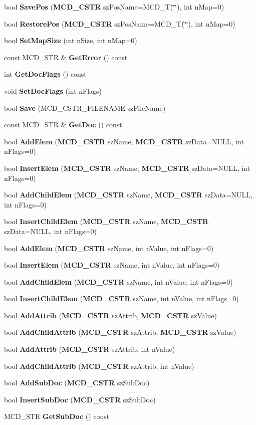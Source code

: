\begin{CompactItemize}
bool {\bf SavePos} ({\bf MCD\_\-CSTR} szPosName=MCD\_\-T(\char`\"{}\char`\"{}), int nMap=0)
\item 
bool {\bf RestorePos} ({\bf MCD\_\-CSTR} szPosName=MCD\_\-T(\char`\"{}\char`\"{}), int nMap=0)
\item 
bool {\bf SetMapSize} (int nSize, int nMap=0)
\item 
const MCD\_\-STR \& {\bf GetError} () const 
\item 
int {\bf GetDocFlags} () const 
\item 
void {\bf SetDocFlags} (int nFlags)
\item 
bool {\bf Save} (MCD\_\-CSTR\_\-FILENAME szFileName)
\item 
const MCD\_\-STR \& {\bf GetDoc} () const 
\item 
bool {\bf AddElem} ({\bf MCD\_\-CSTR} szName, {\bf MCD\_\-CSTR} szData=NULL, int nFlags=0)
\item 
bool {\bf InsertElem} ({\bf MCD\_\-CSTR} szName, {\bf MCD\_\-CSTR} szData=NULL, int nFlags=0)
\item 
bool {\bf AddChildElem} ({\bf MCD\_\-CSTR} szName, {\bf MCD\_\-CSTR} szData=NULL, int nFlags=0)
\item 
bool {\bf InsertChildElem} ({\bf MCD\_\-CSTR} szName, {\bf MCD\_\-CSTR} szData=NULL, int nFlags=0)
\item 
bool {\bf AddElem} ({\bf MCD\_\-CSTR} szName, int nValue, int nFlags=0)
\item 
bool {\bf InsertElem} ({\bf MCD\_\-CSTR} szName, int nValue, int nFlags=0)
\item 
bool {\bf AddChildElem} ({\bf MCD\_\-CSTR} szName, int nValue, int nFlags=0)
\item 
bool {\bf InsertChildElem} ({\bf MCD\_\-CSTR} szName, int nValue, int nFlags=0)
\item 
bool {\bf AddAttrib} ({\bf MCD\_\-CSTR} szAttrib, {\bf MCD\_\-CSTR} szValue)
\item 
bool {\bf AddChildAttrib} ({\bf MCD\_\-CSTR} szAttrib, {\bf MCD\_\-CSTR} szValue)
\item 
bool {\bf AddAttrib} ({\bf MCD\_\-CSTR} szAttrib, int nValue)
\item 
bool {\bf AddChildAttrib} ({\bf MCD\_\-CSTR} szAttrib, int nValue)
\item 
bool {\bf AddSubDoc} ({\bf MCD\_\-CSTR} szSubDoc)
\item 
bool {\bf InsertSubDoc} ({\bf MCD\_\-CSTR} szSubDoc)
\item 
MCD\_\-STR {\bf GetSubDoc} () const 
\item 

\end{CompactItemize}
